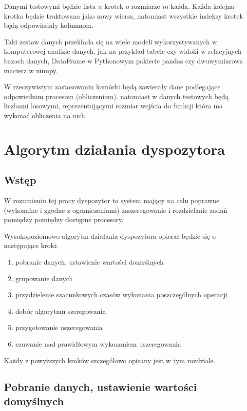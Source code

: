 \documentclass[brudnopis]{xmgr}
\begin{document}
Danymi testowymi będzie lista $n$ krotek o rozmiarze $m$ każda.
Każda kolejna krotka będzie traktowana jako nowy wiersz, natomiast wszystkie indeksy krotek będą odpowiadały kolumnom. 


Taki zestaw danych przekłada się na wiele modeli wykorzystywanych w komputerowej analizie danych, jak na przykład tabele czy widoki w relacyjnych bazach danych, DataFrame w Pythonowym pakiecie pandas czy dwuwymiarowa macierz w numpy.

W rzeczywistym zastosowaniu komórki będą zawierały dane podlegające odpowiednim procesom (obliczeniom), natomiast w danych testowych będą liczbami losowymi, reprezentującymi rozmiar wejścia do funkcji która ma wykonać obliczenia na nich.

\chapter{Algorytm działania dyspozytora}

\section{Wstęp}

W rozumieniu tej pracy dyspozytor to system mający na celu poprawne (wykonalne i zgodne z ograniczeniami) zaszeregowanie i rozdzielanie zadań pomiędzy pomiędzy dostępne procesory.

Wysokopoziomowo algorytm działania dyspozytora opierał będzie się o następujące kroki:

\begin{enumerate}
    \item pobranie danych, ustawienie wartości domyślnych
    \item grupowanie danych
    \item przydzielenie szacunkowych czasów wykonania poszczególnych operacji
    \item dobór algorytmu szeregowania 
    \item przygotowanie uszeregowania
    \item czuwanie nad prawidłowym wykonaniem uszeregowania
\end{enumerate}

Każdy z powyższych kroków szczegółowo opisany jest w tym rozdziale.

\newpage
\section{Pobranie danych, ustawienie wartości domyślnych}
\end{document}
